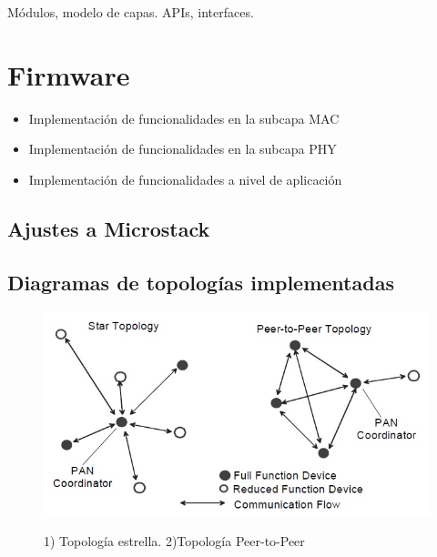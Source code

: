 Módulos, modelo de capas. APIs, interfaces.

\section{Firmware}
\label{sec:firm}

\begin{itemize}
	\item Implementación de funcionalidades en la subcapa MAC

	\item Implementación de funcionalidades en la subcapa PHY

	\item Implementación de funcionalidades a nivel de aplicación
	
\end{itemize}

\subsection{Ajustes a Microstack}


\subsection{Diagramas de topologías implementadas}

\begin{figure}[h!]
	\centering
    \includegraphics[width=.8\textwidth]{./Figures/topologia.jpg}
	\label{fig:topo}
	\caption{1) Topología estrella. 2)Topología Peer-to-Peer}
\end{figure}

